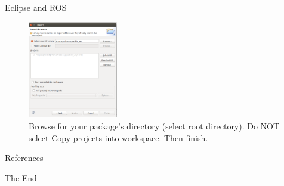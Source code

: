 \documentclass{beamer}
\begin{document}
\begin{frame}{Eclipse and ROS\cite{ROS:2015:Online}}

\begin{figure}
	\centering
  \includegraphics[width=0.35\textwidth]{./images/file.pdf}
	\caption{Browse for your package's directory (select root directory). Do NOT select Copy projects into workspace. Then finish.}
	\label{fig1}
\end{figure}

\end{frame}
\begin{frame}[allowframebreaks]{References}
\scriptsize{}
\end{frame}
\begin{frame}
\Huge{\centerline{The End}}
\end{frame}
\end{document}
